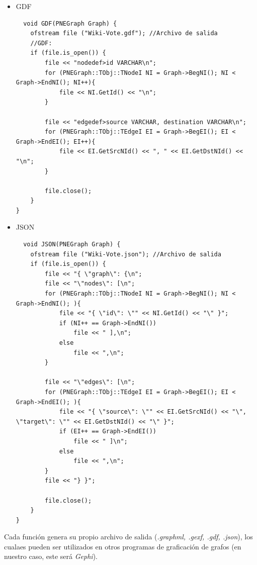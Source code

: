 \documentclass[acmlarge,screen]{acmart}
\begin{document}
\begin{itemize}
\begin{verbatim}
		file << "</edges>\n";
		file << "</graph>\n";
		file << "</gexf>\n";
		file.close();
	}
}
 \end{verbatim}
 
 \item GDF  \label{GDF}
 \begin{verbatim}
  void GDF(PNEGraph Graph) {
	ofstream file ("Wiki-Vote.gdf"); //Archivo de salida
	//GDF:
	if (file.is_open()) {
		file << "nodedef>id VARCHAR\n";
		for (PNEGraph::TObj::TNodeI NI = Graph->BegNI(); NI < Graph->EndNI(); NI++){
			file << NI.GetId() << "\n";
		}

		file << "edgedef>source VARCHAR, destination VARCHAR\n";
		for (PNEGraph::TObj::TEdgeI EI = Graph->BegEI(); EI < Graph->EndEI(); EI++){
			file << EI.GetSrcNId() << ", " << EI.GetDstNId() << "\n";
		}

		file.close();
	}
}
 \end{verbatim}
 
 \item JSON  \label{JSON}
 \begin{verbatim}
  void JSON(PNEGraph Graph) {
	ofstream file ("Wiki-Vote.json"); //Archivo de salida
	if (file.is_open()) {
		file << "{ \"graph\": {\n";
		file << "\"nodes\": [\n";
		for (PNEGraph::TObj::TNodeI NI = Graph->BegNI(); NI < Graph->EndNI(); ){
			file << "{ \"id\": \"" << NI.GetId() << "\" }";
			if (NI++ == Graph->EndNI())
				file << " ],\n";
			else
				file << ",\n";
		}

		file << "\"edges\": [\n";
		for (PNEGraph::TObj::TEdgeI EI = Graph->BegEI(); EI < Graph->EndEI(); ){
			file << "{ \"source\": \"" << EI.GetSrcNId() << "\", \"target\": \"" << EI.GetDstNId() << "\" }";
			if (EI++ == Graph->EndEI())
				file << " ]\n";
			else
				file << ",\n";
		}
		file << "} }";

		file.close();
	}
}
 \end{verbatim}

\end{itemize}

Cada función genera su propio archivo de salida ({\it .graphml, .gexf, .gdf, .json}), los cualaes pueden ser utilizados en otros programas de graficación de grafos (en nuestro caso, este será {\it Gephi}).
\end{document}
